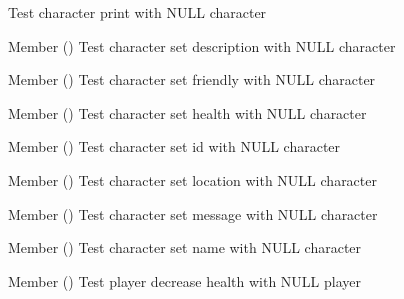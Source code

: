 \begin{DoxyRefList}
%
Test character print with NULL character  
\item[Member \doxylink{character__test_8c_a7aeb214cc3607214d719d6d5727f8907}{test2\+\_\+character\+\_\+set\+\_\+description} ()]\label{test__test000017}%
%
Test character set description with NULL character  
\item[Member \doxylink{character__test_8c_a0b796a2462560391b16de03607cb52e6}{test2\+\_\+character\+\_\+set\+\_\+friendly} ()]\label{test__test000027}%
%
Test character set friendly with NULL character  
\item[Member \doxylink{character__test_8c_ac5e97fabc0591e9b2021d0ced0b39300}{test2\+\_\+character\+\_\+set\+\_\+health} ()]\label{test__test000021}%
%
Test character set health with NULL character  
\item[Member \doxylink{character__test_8c_acee8dbf1f524f775b598e4a58136cc53}{test2\+\_\+character\+\_\+set\+\_\+id} ()]\label{test__test000005}%
%
Test character set id with NULL character  
\item[Member \doxylink{character__test_8c_a88216e72c5744d4cd8e2614951c90ddc}{test2\+\_\+character\+\_\+set\+\_\+location} ()]\label{test__test000009}%
%
Test character set location with NULL character  
\item[Member \doxylink{character__test_8c_afae2256c79ebaf31b7402307dad69253}{test2\+\_\+character\+\_\+set\+\_\+message} ()]\label{test__test000031}%
%
Test character set message with NULL character  
\item[Member \doxylink{character__test_8c_a74b160bc91661973b864acec8b9a16ce}{test2\+\_\+character\+\_\+set\+\_\+name} ()]\label{test__test000013}%
%
Test character set name with NULL character  
\item[Member \doxylink{player__test_8c_a8c0cb9c6989aa43c2e38c120a6644250}{test2\+\_\+decrease\+\_\+health} ()]\label{test__test000076}%
%
Test player decrease health with NULL player 


\end{DoxyRefList}
